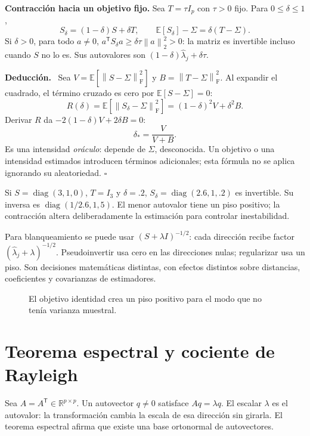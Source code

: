 \documentclass[11pt,a4paper]{article}
\newcommand{\R}{\mathbb R}
\newcommand{\E}{\mathbb E}
\newcommand{\T}{^{\mathsf T}}
\newcommand{\norm}[1]{\left\lVert #1\right\rVert}
\DeclareMathOperator{\diag}{diag}
\newcommand{\F}{_{\mathrm F}}
\newcommand{\topic}[2]{\clearpage\section{#1}\label{#2}}
\newenvironment{deduccion}{\par\textbf{Deducción.}\ }{\hfill$\square$\par}
\theoremstyle{definition}\newtheorem{definicion}[teorema]{Definición}
\begin{document}
\textbf{Contracción hacia un objetivo fijo.}
Sea $T=\tau I_p$ con $\tau>0$ fijo. Para $0\le\delta\le1$,
\[
S_\delta=(1-\delta)S+\delta T,\qquad
\E[S_\delta]-\Sigma=\delta(T-\Sigma).
\]
Si $\delta>0$, para todo $a\ne0$,
$a\T S_\delta a\ge\delta\tau\norm a_2^2>0$:
la matriz es invertible incluso cuando $S$ no lo es.
Sus autovalores son $(1-\delta)\widehat\lambda_j+\delta\tau$.

\begin{deduccion}
Sea $V=\E[\norm{S-\Sigma}\F^2]$ y $B=\norm{T-\Sigma}\F^2$.
Al expandir el cuadrado, el término cruzado es cero por
$\E[S-\Sigma]=0$:
\[
R(\delta)=\E[\norm{S_\delta-\Sigma}\F^2]
=(1-\delta)^2V+\delta^2B.
\]
Derivar $R$ da $-2(1-\delta)V+2\delta B=0$:
\[
\boxed{\delta_*=\frac{V}{V+B}}.
\]
Es una intensidad \emph{oráculo}: depende de $\Sigma$, desconocida.
Un objetivo o una intensidad estimados introducen términos adicionales;
esta fórmula no se aplica ignorando su aleatoriedad.
\end{deduccion}
\begin{ejemplo}
Si $S=\diag(3,1,0)$, $T=I_3$ y $\delta=.2$,
$S_\delta=\diag(2.6,1,.2)$ es invertible.
Su inversa es $\diag(1/2.6,1,5)$.
El menor autovalor tiene un piso positivo; la contracción altera
deliberadamente la estimación para controlar inestabilidad.
\end{ejemplo}
Para blanqueamiento se puede usar
$(S+\lambda I)^{-1/2}$: cada dirección recibe factor
$(\widehat\lambda_j+\lambda)^{-1/2}$.
Pseudoinvertir usa cero en las direcciones nulas; regularizar usa un piso.
Son decisiones matemáticas distintas, con efectos distintos sobre
distancias, coeficientes y covarianzas de estimadores.

\begin{figure}[H]\centering
{}
\caption{El objetivo identidad crea un piso positivo para el modo que no tenía varianza muestral.}
\end{figure}
\topic{Teorema espectral y cociente de Rayleigh}{s27}
Sea $A=A\T\in\R^{p\times p}$. Un autovector $q\ne0$ satisface
$Aq=\lambda q$. El escalar $\lambda$ es el autovalor:
la transformación cambia la escala de esa dirección sin girarla.
El teorema espectral afirma que existe una base ortonormal de autovectores.
\end{document}
